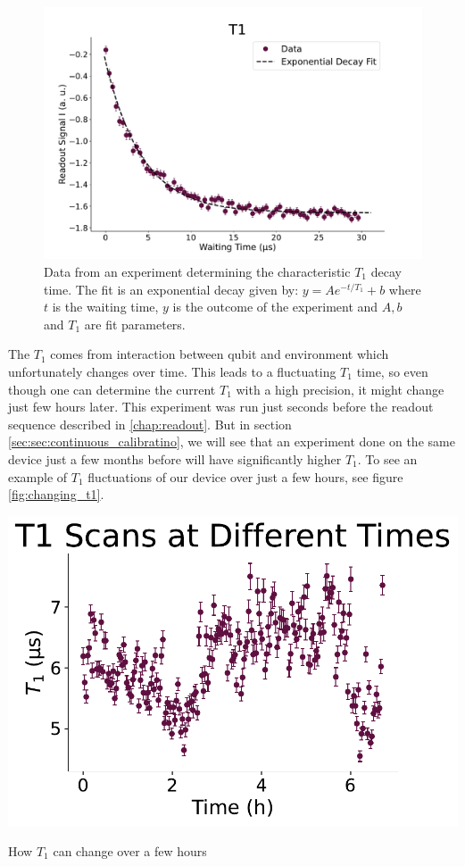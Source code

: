 \begin{figure}
    \centering
    \includegraphics[]{Calibrations/Figures/T1.pdf}
    \caption{Data from an experiment determining the characteristic $T_1$ decay time. The fit is an exponential decay given by: $y = A e^{-t / T_1} + b$ where $t$ is the waiting time, $y$ is the outcome of the experiment and $A, b$ and $T_1$ are fit parameters.}
    \label{fig:calibration_T_1_decay}
\end{figure}

The $T_1$ comes from interaction between qubit and environment which unfortunately changes over time. This leads to a fluctuating $T_1$ time, so even though one can determine the current $T_1$ with a high precision, it might change just few hours later. This experiment was run just seconds before the readout sequence described in \ref{chap:readout}. But in section \ref{sec:sec:continuous_calibratino}, we will see that an experiment done on the same device just a few months before will have significantly higher $T_1$. To see an example of $T_1$ fluctuations of our device over just a few hours, see figure \ref{fig:changing_t1}.
\begin{marginfigure}[-5 cm]
    \centering
    \includegraphics[]{Calibrations/Figures/T1 Scans at Different Times.pdf}
    \caption{How $T_1$ can change over a few hours}
    \label{fig:changing_t1}
\end{marginfigure}

